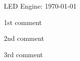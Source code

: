 \documentclass{led_doc}
\begin{document}
LED Engine: \today \hrulefill

\begin{ledCmnt}
1st comment
\end{ledCmnt}

\begin{ledDef}
\end{ledDef}

\begin{ledCmnt}
2nd comment
\end{ledCmnt}

\begin{ledDef}
\end{ledDef}

\begin{ledCmnt}
3rd comment
\end{ledCmnt}
\end{document}
